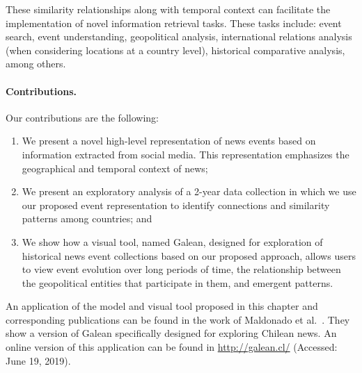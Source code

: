 These similarity relationships along with temporal context can facilitate the
implementation of novel information retrieval tasks. 
%
These tasks include: event search, event understanding, geopolitical analysis,
international relations analysis (when considering locations at a country
level), historical comparative analysis, among others.

\paragraph{Contributions.} Our contributions are the following:

\begin{enumerate}
\item We present a novel high-level representation of news events based on
information extracted from social media. This representation emphasizes the
geographical and temporal context of news;
\item We present an exploratory analysis of a 2-year data collection in which we
use our proposed event representation to identify connections and similarity
patterns among countries; and
\item We show how a visual tool, named Galean, designed for exploration of
historical news event collections based on our proposed approach, allows users
to view event evolution over long periods of time, the relationship between the
geopolitical entities that participate in them, and emergent patterns.
\end{enumerate}

An application of the model and visual tool proposed in this chapter and
corresponding publications can be found in the work of Maldonado et
al.~\cite{maldonado2015spatio}.
%
They show a version of Galean specifically designed for exploring Chilean news.
%
An online version of this application can be found in \url{http://galean.cl/}
(Accessed: June 19, 2019).